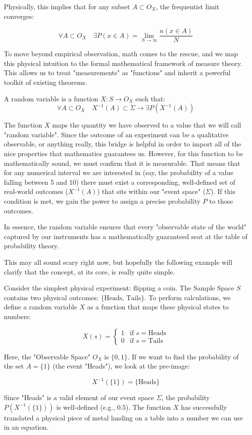 Physically, this implies that for any subset $A \subset O_X$, the frequentist limit converges:

	\[
	\forall A \subset O_X \quad \exists P(x\in A) = \lim_{N\to\infty}\frac{n(x\in A)}{N}
	\]


To move beyond empirical observation, math comes to the rescue, and we map this physical intuition to the formal mathematical framework of measure theory. This allows us to treat "measurements" as "functions" and inherit a powerful toolkit of existing theorems.

\begin{definition}
	A random variable is a function $X: S\rightarrow O_X$ such that:
	\[
	\forall A \subset O_X \quad X^{-1}(A)\subset \Sigma \rightarrow \exists P(X^{-1}(A))
	\]
\end{definition}


The function $X$  maps the quantity we have observed to a value that we will call "random variable". Since the outcome of an experiment can be a qualitative observable, or anything really, this bridge is helpful in order to import all of the nice properties that mathematics guarantees us. However, for this function to be mathematically sound, we must confirm that it is measurable. That means that for any numerical interval we are interested in (say, the probability of a value falling between 5 and 10) there must exist a corresponding, well-defined set of real-world outcomes ($X^{-1}(A)$) that sits within our "event space" ($\Sigma$). If this condition is met, we gain the power to assign a precise probability $P$ to those outcomes.

In essence, the random variable ensures that every "observable state of the world" captured by our instruments has a mathematically guaranteed seat at the table of probability theory.

This may all sound scary right now, but hopefully the following example will clarify that the concept, at its core, is really quite simple. 

\begin{example}
	Consider the simplest physical experiment: flipping a coin. The Sample Space $S$ contains two physical outcomes: $\{\text{Heads,}$ $\text{Tails}\}$. To perform calculations, we define a random variable $X$ as a function that maps these physical states to numbers:
	
	\[
	X(s) = \begin{cases} 1 & \text{if } s = \text{Heads} \\ 0 & \text{if } s = \text{Tails} \end{cases}
	\]
	
	Here, the "Observable Space" $O_X$ is $\{0, 1\}$. If we want to find the probability of the set $A = \{1\}$ (the event "Heads"), we look at the pre-image:
	
	
	\[
	X^{-1}(\{1\}) = \{\text{Heads}\}
	\]
	
	Since "Heads" is a valid element of our event space $\Sigma$, the probability $P(X^{-1}(\{1\}))$ is well-defined (e.g., $0.5$). The function $X$ has successfully translated a physical piece of metal landing on a table into a number we can use in an equation.
\end{example}

